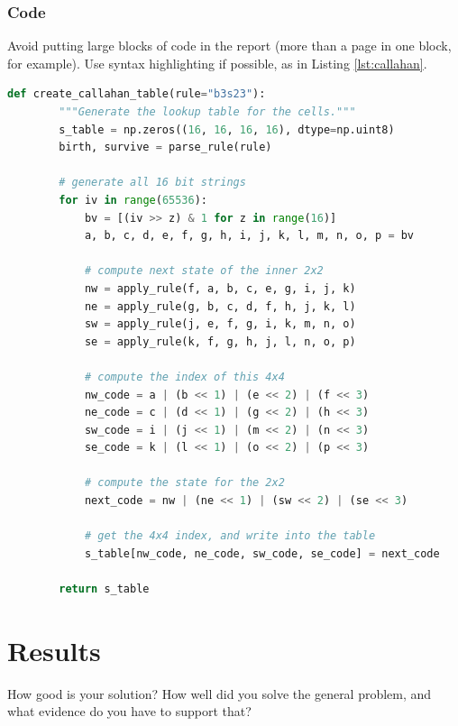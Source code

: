\documentclass{l4proj}
\theoremstyle{definition}
\begin{document}
\subsection{Code}

Avoid putting large blocks of code in the report (more than a page in one block, for example). Use syntax highlighting if possible, as in Listing \ref{lst:callahan}.

\begin{lstlisting}[language=python, float, caption={The algorithm for packing the $3\times 3$ outer-totalistic binary CA successor rule into a 
    $16\times 16\times 16\times 16$ 4 bit lookup table, running an equivalent, notionally 16-state $2\times 2$ CA.}, label=lst:callahan]
    def create_callahan_table(rule="b3s23"):
        """Generate the lookup table for the cells."""        
        s_table = np.zeros((16, 16, 16, 16), dtype=np.uint8)
        birth, survive = parse_rule(rule)

        # generate all 16 bit strings
        for iv in range(65536):
            bv = [(iv >> z) & 1 for z in range(16)]
            a, b, c, d, e, f, g, h, i, j, k, l, m, n, o, p = bv

            # compute next state of the inner 2x2
            nw = apply_rule(f, a, b, c, e, g, i, j, k)
            ne = apply_rule(g, b, c, d, f, h, j, k, l)
            sw = apply_rule(j, e, f, g, i, k, m, n, o)
            se = apply_rule(k, f, g, h, j, l, n, o, p)

            # compute the index of this 4x4
            nw_code = a | (b << 1) | (e << 2) | (f << 3)
            ne_code = c | (d << 1) | (g << 2) | (h << 3)
            sw_code = i | (j << 1) | (m << 2) | (n << 3)
            se_code = k | (l << 1) | (o << 2) | (p << 3)

            # compute the state for the 2x2
            next_code = nw | (ne << 1) | (sw << 2) | (se << 3)

            # get the 4x4 index, and write into the table
            s_table[nw_code, ne_code, sw_code, se_code] = next_code

        return s_table

\end{lstlisting}

\chapter{Results} 
How good is your solution? How well did you solve the general problem, and what evidence do you have to support that?
\end{document}
